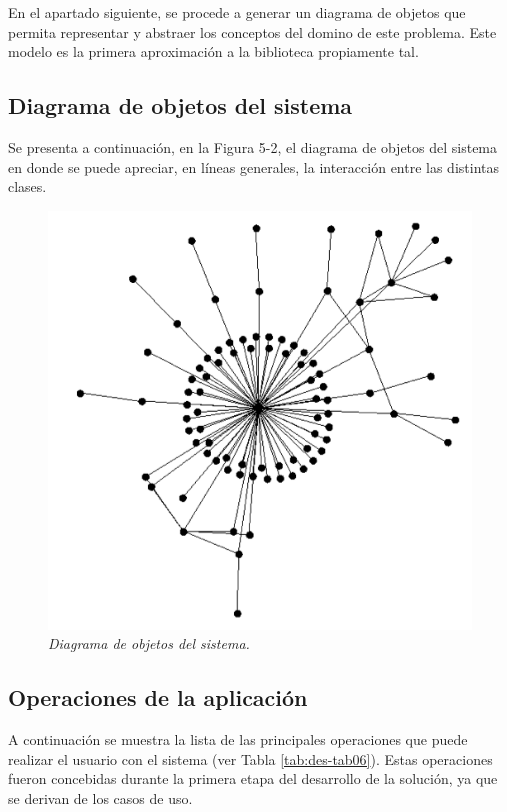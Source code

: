 En el apartado siguiente, se procede a generar un diagrama de objetos que permita representar y abstraer los conceptos del domino de este problema. Este modelo es la primera aproximación a la biblioteca propiamente tal.

\subsection{Diagrama de objetos del sistema}

Se presenta a continuación, en la Figura 5-2, el diagrama de objetos del sistema en donde se puede apreciar, en líneas generales, la interacción entre las distintas clases.

\begin{figure}[H]
	\centering
	\includegraphics[scale=1]{images/Figura5-2}
	\caption{\em Diagrama de objetos del sistema.}
	\label{fig:des-im2}
\end{figure}

\subsection{Operaciones de la aplicación}

A continuación se muestra la lista de las principales operaciones que puede realizar el usuario con el sistema (ver Tabla \ref{tab:des-tab06}). Estas operaciones fueron concebidas durante la primera etapa del desarrollo de la solución, ya que se derivan de los casos de uso.

